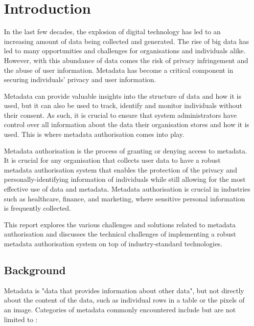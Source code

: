 \chapter{Introduction}
\label{cha:intro}

In the last few decades, the explosion of digital technology has led to an increasing amount of data being collected and generated. The rise of big data has led to many opportunities and challenges for organisations and individuals alike. However, with this abundance of data comes the risk of privacy infringement and the abuse of user information. Metadata has become a critical component in securing individuals' privacy and user information.

Metadata can provide valuable insights into the structure of data and how it is used, but it can also be used to track, identify and monitor individuals without their consent. As such, it is crucial to ensure that system administrators have control over all information about the data their organisation stores and how it is used. This is where metadata authorisation comes into play.

Metadata authorisation is the process of granting or denying access to metadata. It is crucial for any organisation that collects user data to have a robust metadata authorisation system that enables the protection of the privacy and personally-identifying information of individuals while still allowing for the most effective use of data and metadata. Metadata authorisation is crucial in industries such as healthcare, finance, and marketing, where sensitive personal information is frequently collected.

This report explores the various challenges and solutions related to metadata authorisation and discusses the technical challenges of implementing a robust metadata authorisation system on top of industry-standard technologies.

 \section{Background}

 Metadata is "data that provides information about other data", but not directly about the content of the data, such as individual rows in a table or the pixels of an image. Categories of metadata commonly encountered include but are not limited to \cite{understandingMetadataRiley2017}:

